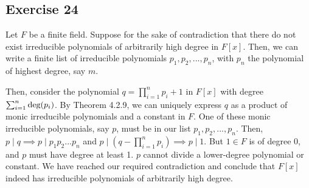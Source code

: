 \subsection*{Exercise 24}
Let $F$ be a finite field. Suppose for the sake of contradiction that there do not exist irreducible polynomials of arbitrarily high degree in $F[x]$. Then, we can write a finite list of irreducible polynomials $p_1,p_2,...,p_n$, with $p_n$ the polynomial of highest degree, say $m$.

Then, consider the polynomial $q = \prod_{i=1}^n p_i + 1$ in $F[x]$ with degree $\sum_{i=1}^n \textnormal{deg}(p_i)$. By Theorem 4.2.9, we can uniquely express $q$ as a product of monic irreducible polynomials and a constant in $F$. One of these monic irreducible polynomials, say $p$, must be in our list $p_1,p_2,...,p_n$. Then, $p \mid q \implies p \mid p_1p_2...p_n$ and $p \mid (q - \prod_{i=1}^n p_i) \implies p \mid 1$. But $1 \in F$ is of degree 0, and $p$ must have degree at least 1. $p$ cannot divide a lower-degree polynomial or constant. We have reached our required contradiction and conclude that $F[x]$ indeed has irreducible polynomials of arbitrarily high degree.